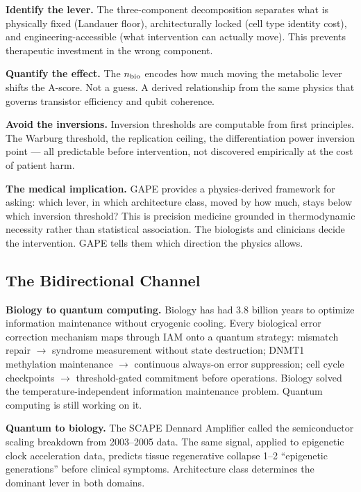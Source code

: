 \documentclass[12pt,a4paper]{article}
\begin{document}
\textbf{Identify the lever.} The three-component decomposition
separates what is physically fixed (Landauer floor), architecturally
locked (cell type identity cost), and engineering-accessible (what
intervention can actually move). This prevents therapeutic investment
in the wrong component.

\textbf{Quantify the effect.} The $n_{\rm bio}$ encodes how much
moving the metabolic lever shifts the A-score. Not a guess.
A derived relationship from the same physics that governs
transistor efficiency and qubit coherence.

\textbf{Avoid the inversions.} Inversion thresholds are computable
from first principles. The Warburg threshold, the replication ceiling,
the differentiation power inversion point --- all predictable before
intervention, not discovered empirically at the cost of patient harm.

\begin{keybox}
\textbf{The medical implication.}
GAPE provides a physics-derived framework for asking: which lever,
in which architecture class, moved by how much, stays below which
inversion threshold? This is precision medicine grounded in
thermodynamic necessity rather than statistical association.
The biologists and clinicians decide the intervention.
GAPE tells them which direction the physics allows.
\end{keybox}

\subsection{The Bidirectional Channel}

\textbf{Biology to quantum computing.}
Biology has had 3.8 billion years to optimize information maintenance
without cryogenic cooling. Every biological error correction mechanism
maps through IAM onto a quantum strategy:
mismatch repair $\to$ syndrome measurement without state destruction;
DNMT1 methylation maintenance $\to$ continuous always-on error suppression;
cell cycle checkpoints $\to$ threshold-gated commitment before operations.
Biology solved the temperature-independent information maintenance problem.
Quantum computing is still working on it.

\textbf{Quantum to biology.}
The SCAPE Dennard Amplifier called the semiconductor scaling breakdown
from 2003--2005 data. The same signal, applied to epigenetic clock
acceleration data, predicts tissue regenerative collapse 1--2
``epigenetic generations'' before clinical symptoms.
Architecture class determines the dominant lever in both domains.
\end{document}

